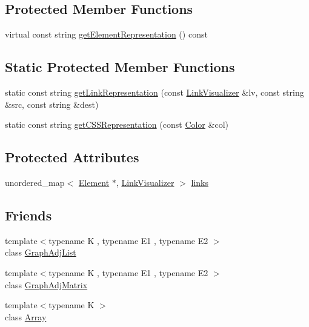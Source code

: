 \subsection*{Protected Member Functions}
\begin{DoxyCompactItemize}
\item 
virtual const string \hyperlink{classbridges_1_1_element_aac13ea6244099496172c8549e48a9f73}{get\+Element\+Representation} () const 
\end{DoxyCompactItemize}
\subsection*{Static Protected Member Functions}
\begin{DoxyCompactItemize}
\item 
static const string \hyperlink{classbridges_1_1_element_ac6fa7b04e28a1e9b8d8f2d395dd6e2c1}{get\+Link\+Representation} (const \hyperlink{classbridges_1_1_link_visualizer}{Link\+Visualizer} \&lv, const string \&src, const string \&dest)
\item 
static const string \hyperlink{classbridges_1_1_element_a513b3409e4b689a390b0dcd50cc2d643}{get\+C\+S\+S\+Representation} (const \hyperlink{classbridges_1_1_color}{Color} \&col)
\end{DoxyCompactItemize}
\subsection*{Protected Attributes}
\begin{DoxyCompactItemize}
\item 
unordered\+\_\+map$<$ \hyperlink{classbridges_1_1_element}{Element} $\ast$, \hyperlink{classbridges_1_1_link_visualizer}{Link\+Visualizer} $>$ \hyperlink{classbridges_1_1_element_a6fb53728edc378f26238543b26238496}{links}
\end{DoxyCompactItemize}
\subsection*{Friends}
\begin{DoxyCompactItemize}
\item 
{\footnotesize template$<$typename K , typename E1 , typename E2 $>$ }\\class \hyperlink{classbridges_1_1_element_a65850138f0763fec43a76fb942f0eccc}{Graph\+Adj\+List}
\item 
{\footnotesize template$<$typename K , typename E1 , typename E2 $>$ }\\class \hyperlink{classbridges_1_1_element_a1935808473b7eb8ff54149c5436c3ac9}{Graph\+Adj\+Matrix}
\item 
{\footnotesize template$<$typename K $>$ }\\class \hyperlink{classbridges_1_1_element_ab1a595168ea1870ce436dfd2d8e69b6d}{Array}
\end{DoxyCompactItemize}


